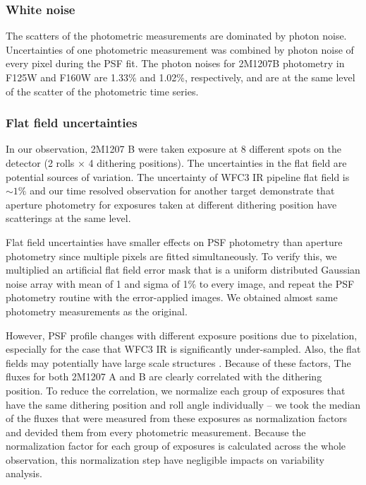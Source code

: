 \documentclass[apj]{emulateapj}
\begin{document}
\subsubsection{White noise}
The scatters of the photometric measurements are dominated by photon
noise. Uncertainties of one photometric measurement was combined by
photon noise of every pixel during the PSF fit. The photon noises for
2M1207B photometry in F125W and F160W are 1.33\% and 1.02\%,
respectively, and are at the same level of the scatter of the
photometric time series.

\subsubsection{Flat field uncertainties}
In our observation, 2M1207 B were taken exposure at 8 different spots
on the detector (2 rolls $\times$ 4 dithering
positions). The uncertainties in the flat field are potential sources of variation. The uncertainty of WFC3 IR pipeline flat field
is $\sim 1\%$ \citep{dressel2012wide} and our time resolved observation for another target
demonstrate that aperture photometry for exposures taken at different
dithering position have scatterings at the same level.

Flat field uncertainties have smaller effects on PSF photometry than
aperture photometry since
multiple pixels are fitted simultaneously. To verify this, we multiplied
an artificial flat field error mask that is a uniform distributed
Gaussian noise array with mean of 1 and sigma of 1\% to every image,
and repeat the PSF photometry routine with the error-applied
images. We obtained almost same photometry measurements as the
original.

However, PSF profile changes with different exposure positions due to
pixelation, especially for the case that WFC3 IR is significantly
under-sampled. Also, the flat fields may potentially have large scale
structures \citep{dressel2012wide}. Because of these factors, The
fluxes for both 2M1207 A and B are clearly correlated with the
dithering position. To reduce the correlation, we normalize each group of exposures
that have the same dithering position and roll angle individually --
we took the median of the fluxes that were measured from these
exposures as normalization factors and devided them from every photometric
measurement. Because the normalization factor for each group of
exposures is calculated across the whole observation, this
normalization step have negligible impacts on variability analysis.
\end{document}
